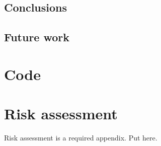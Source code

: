     \subsection{Conclusions}
      \subsection{Future work}
    \printbibliography
  \begin{uomappendix} 
      \section{Code}
      \section{Risk assessment}
      Risk assessment is a required appendix. Put here.
  \end{uomappendix}
  
  